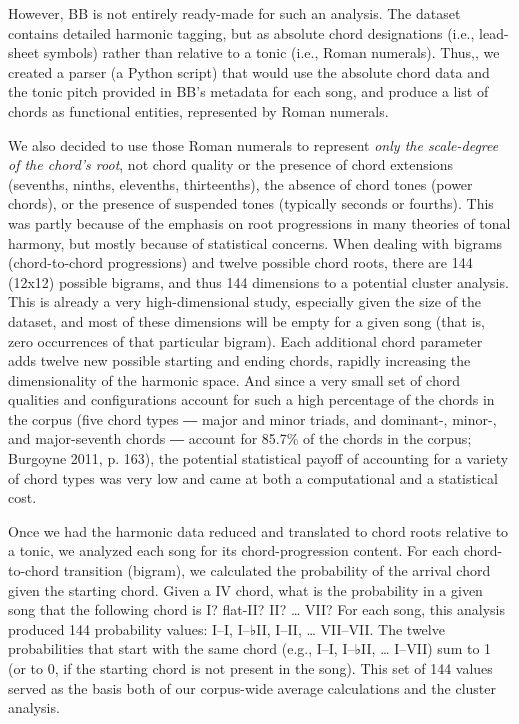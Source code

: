However, BB is not entirely ready-made for such an analysis. The dataset contains detailed harmonic tagging, but as absolute chord designations (i.e., lead-sheet symbols) rather than relative to a tonic (i.e., Roman numerals). Thus,, we created a parser (a Python script) that would use the absolute chord data and the tonic pitch provided in BB's metadata for each song, and produce a list of chords as functional entities, represented by Roman numerals.

We also decided to use those Roman numerals to represent \emph{only the scale-degree of the chord's root}, not chord quality or the presence of chord extensions (sevenths, ninths, elevenths, thirteenths), the absence of chord tones (power chords), or the presence of suspended tones (typically seconds or fourths). This was partly because of the emphasis on root progressions in many theories of tonal harmony, but mostly because of statistical concerns. When dealing with bigrams (chord-to-chord progressions) and twelve possible chord roots, there are 144 (12x12) possible bigrams, and thus 144 dimensions to a potential cluster analysis. This is already a very high-dimensional study, especially given the size of the dataset, and most of these dimensions will be empty for a given song (that is, zero occurrences of that particular bigram). Each additional chord parameter adds twelve new possible starting and ending chords, rapidly increasing the dimensionality of the harmonic space. And since a very small set of chord qualities and configurations account for such a high percentage of the chords in the corpus (five chord types ― major and minor triads, and dominant-, minor-, and major-seventh chords ― account for 85.7\% of the chords in the corpus; Burgoyne 2011, p. 163), the potential statistical payoff of accounting for a variety of chord types was very low and came at both a computational and a statistical cost.

Once we had the harmonic data reduced and translated to chord roots relative to a tonic, we analyzed each song for its chord-progression content. For each chord-to-chord transition (bigram), we calculated the probability of the arrival chord given the starting chord. Given a IV chord, what is the probability in a given song that the following chord is I? flat-II? II? {\ldots} VII? For each song, this analysis produced 144 probability values: I–I, I–♭II, I–II, {\ldots} VII–VII. The twelve probabilities that start with the same chord (e.g., I–I, I–♭II, {\ldots} I–VII) sum to 1 (or to 0, if the starting chord is not present in the song). This set of 144 values served as the basis both of our corpus-wide average calculations and the cluster analysis.

